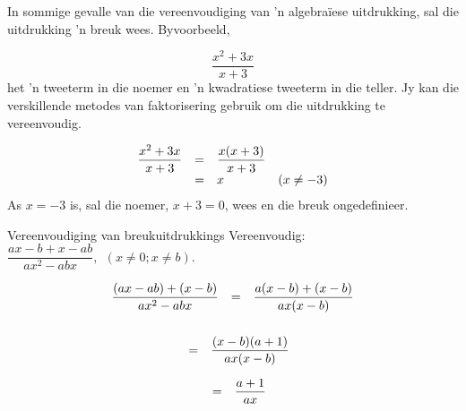 In sommige gevalle van die vereenvoudiging van ’n algebraïese uitdrukking, sal die uitdrukking ’n breuk wees. Byvoorbeeld,

\begin{equation*}
\dfrac{{x}^{2}+3x}{x+3}
\end{equation*}
het ’n tweeterm in die noemer en ’n kwadratiese tweeterm in die teller. Jy kan die verskillende metodes van faktorisering gebruik om die uitdrukking te vereenvoudig.\par 

\begin{equation*}
\begin{array}{llll} \dfrac{{x}^{2}+3x}{x+3}\hfill & =& \dfrac{x(x+3)}{x+3}\hfill & \\ & =& x\hfill & (x\neq -3)\hfill \end{array}
\end{equation*}
As $x = -3$ is, sal die noemer, $x+3 = 0$, wees en die breuk ongedefinieer.\par


\clearpage
\begin{wex}{Vereenvoudiging van breukuitdrukkings }{Vereenvoudig: $\dfrac{ax-b+x-ab}{a{x}^{2}-abx}, ~~(x \neq 0;x \neq b)$.}
{
\begin{equation*}
\begin{array}{lll}\dfrac{(ax-ab)+(x-b)}{a{x}^{2}-abx}\hfill & =& \dfrac{a(x-b)+(x-b)}{ax(x-b)}\hfill \\ \end{array}
\end{equation*}
\begin{equation*}
\begin{array}{lll}
\\& =& \dfrac{(x-b)(a+1)}{ax(x-b)}\hfill \end{array}
\end{equation*}

\begin{equation*}
\begin{array}{ccc}& =& \dfrac{a+1}{ax}\hfill \end{array}
\end{equation*}
}
\end{wex}

